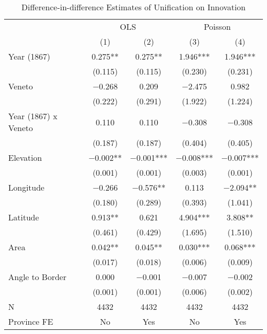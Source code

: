 \begin{table}[!h]

\caption{\label{tab:did_analysis_number}Difference-in-difference Estimates of Unification on Innovation}
\centering
\fontsize{9}{11}\selectfont
\begin{threeparttable}
\begin{tabular}[t]{lcccc}
\toprule
\multicolumn{1}{c}{ } & \multicolumn{2}{c}{OLS} & \multicolumn{2}{c}{Poisson} \\
\cmidrule(l{3pt}r{3pt}){2-3} \cmidrule(l{3pt}r{3pt}){4-5}
  & (1) & (2) & (3) & (4)\\
\midrule
Year (1867) & \num{0.275}** & \num{0.275}** & \num{1.946}*** & \num{1.946}***\\
 & (\num{0.115}) & (\num{0.115}) & (\num{0.230}) & (\num{0.231})\\
Veneto & \num{-0.268} & \num{0.209} & \num{-2.475} & \num{0.982}\\
 & (\num{0.222}) & (\num{0.291}) & (\num{1.922}) & (\num{1.224})\\
Year (1867) x Veneto & \num{0.110} & \num{0.110} & \num{-0.308} & \num{-0.308}\\
 & (\num{0.187}) & (\num{0.187}) & (\num{0.404}) & (\num{0.405})\\
Elevation & \num{-0.002}** & \num{-0.001}*** & \num{-0.008}*** & \num{-0.007}***\\
 & (\num{0.001}) & (\num{0.001}) & (\num{0.003}) & (\num{0.001})\\
Longitude & \num{-0.266} & \num{-0.576}** & \num{0.113} & \num{-2.094}**\\
 & (\num{0.180}) & (\num{0.289}) & (\num{0.393}) & (\num{1.041})\\
Latitude & \num{0.913}** & \num{0.621} & \num{4.904}*** & \num{3.808}**\\
 & (\num{0.461}) & (\num{0.429}) & (\num{1.695}) & (\num{1.510})\\
Area & \num{0.042}** & \num{0.045}** & \num{0.030}*** & \num{0.068}***\\
 & (\num{0.017}) & (\num{0.018}) & (\num{0.006}) & (\num{0.009})\\
Angle to Border & \num{0.000} & \num{-0.001} & \num{-0.007} & \num{-0.002}\\
 & (\num{0.001}) & (\num{0.001}) & (\num{0.006}) & (\num{0.002})\\
\midrule
N & \num{4432} & \num{4432} & \num{4432} & \num{4432}\\
Province FE & No & Yes & No & Yes\\

\end{tabular}
\end{threeparttable}
\end{table}

